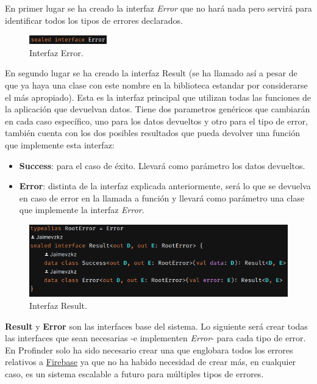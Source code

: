 En primer lugar se ha creado la interfaz \textit{Error} que no hará nada pero servirá para identificar todos los tipos de errores declarados.
\begin{figure}[h]
    \centering
    \includegraphics[width = 0.3\textwidth]{Imagenes/Fuentes/error_interface.png}
    \caption{Interfaz Error.}
    \label{fig:error_interface}
\end{figure}
En segundo lugar se ha creado la interfaz Result (se ha llamado así a pesar de que ya haya una clase con este nombre en la biblioteca estandar por considerarse el más apropiado). Esta es la interfaz principal que utilizan todas las funciones de la aplicación que devuelvan datos. Tiene dos parametros genéricos que cambiarán en cada caso específico, uno para los datos devueltos y otro para el tipo de error, también cuenta con los dos posibles resultados que pueda devolver una función que implemente esta interfaz: 
\begin{itemize}
    \item \textbf{Success}: para el caso de éxito. Llevará como parámetro los datos devueltos.
    \item \textbf{Error}: distinta de la interfaz explicada anteriormente, será lo que se devuelva en caso de error en la llamada a función y llevará como parámetro una clase que implemente la interfaz \textit{Error}.
\end{itemize}
\newpage
\begin{figure}[h]
    \centering
    \includegraphics[width = 1\textwidth]{Imagenes/Fuentes/ejemplo_result.png}
    \caption{Interfaz Result.}
    \label{fig:ejemplo_result}
\end{figure}
\textbf{Result} y \textbf{Error} son las interfaces base del sistema. Lo siguiente será crear todas las interfaces que sean necesarias -e implementen \textit{Error}- para cada tipo de error. En Profinder solo ha sido necesario crear una que englobara todos los errores relativos a \hyperlink{subsec:firebase}{Firebase} ya que no ha habido necesidad de crear más, en cualquier caso, es un sistema escalable a futuro para múltiples tipos de errores.

